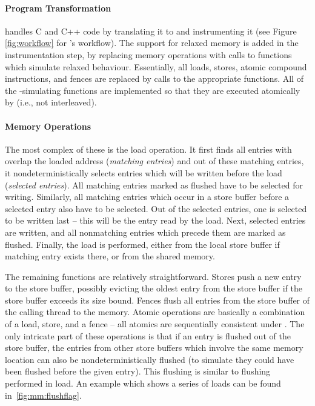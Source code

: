 \paragraph{Program Transformation}%
%
\divine handles C and C++ code by translating it to \llvm and instrumenting it (see Figure \ref{fig:workflow} for \divine's workflow).
The support for relaxed memory is added in the instrumentation step, by replacing memory operations with calls to functions which simulate relaxed behaviour.
Essentially, all loads, stores, atomic compound instructions, and fences are replaced by calls to the appropriate functions.
All of the \xtso-simulating functions are implemented so that they are executed atomically by \divine (i.e., not interleaved).

\paragraph{\xtso Memory Operations}
%
The most complex of these is the load operation.
It first finds all entries with overlap the loaded address (\emph{matching entries}) and out of these matching entries, it nondeterministically selects entries which will be written before the load (\emph{selected entries}).
All matching entries marked as flushed have to be selected for writing.
Similarly, all matching entries which occur in a store buffer before a selected entry also have to be selected.
Out of the selected entries, one is selected to be written last -- this will be the entry read by the load.
Next, selected entries are written, and all nonmatching entries which precede them are marked as flushed.
Finally, the load is performed, either from the local store buffer if matching
entry exists there, or from the shared memory.

The remaining functions are relatively straightforward.
Stores push a new entry to the store buffer, possibly evicting the oldest entry
from the store buffer if the store buffer exceeds its size bound.
Fences flush all entries from the store buffer of the calling thread to the
memory.
Atomic operations are basically a combination of a load, store, and a fence --
all atomics are sequentially consistent under \xtso.
The only intricate part of these operations is that if an entry is flushed out
of the store buffer, the entries from other store buffers which involve the
same memory location can also be nondeterministically flushed (to simulate
they could have been flushed before the given entry).
This flushing is similar to flushing performed in load.
An example which shows a series of loads can be found in~\autoref{fig:mm:flushflag}.

